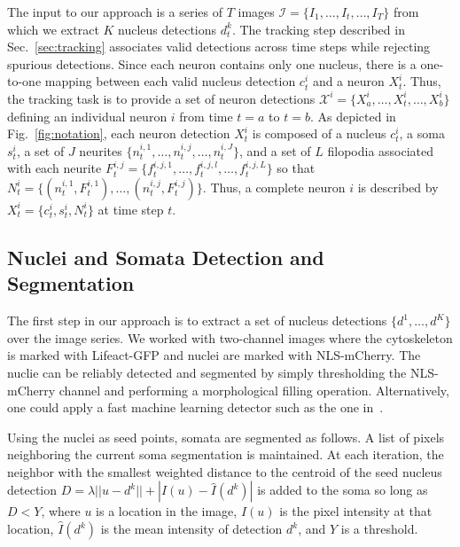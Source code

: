 
\vspace{-3mm}

The  input to  our approach  is a  series of  $T$ images  $\mathcal{I}  = \{I_1,
\ldots,  I_t,  \ldots, I_T\}$  from  which  we  extract $K$  nucleus  detections
$d_t^k$.   The  tracking step  described  in Sec.~\ref{sec:tracking}  associates
valid detections  across time steps  while rejecting spurious  detections. Since
each neuron  contains only  one nucleus, there  is a one-to-one  mapping between
each valid  nucleus detection $c_t^i$ and  a neuron $X_t^i$.  Thus, the tracking
task   is   to  provide   a   set   of   neuron  detections   $\mathcal{X}^i   =
\{X_{a}^i,\ldots,X_t^i,\ldots,X_{b}^i \}$ defining an individual neuron $i$ from
time  $t=a$  to $t=b$.   As  depicted  in  Fig.~\ref{fig:notation}, each  neuron
detection $X_t^i$ is composed of a nucleus $c_t^i$, a soma $s_t^i$, a set of $J$
neurites $\{n_t^{i,1},  \ldots, n_t^{i,j}, \ldots,  n_t^{i,J} \}$, and a  set of
$L$     filopodia    associated     with    each     neurite     $F_t^{i,j}    =
\{f_t^{i,j,1},\ldots,f_t^{i,j,l},\ldots,f_t^{i,j,L}  \}$ so  that  $N_t^i =  \{(
n_t^{i,1},F_t^{i,1}), \ldots,(n_t^{i,j},F_t^{i,j}) \}$.  Thus, a complete neuron
$i$ is described by $X_t^i = \{ c_t^i, s_t^i, N_t^i \}$ at time step $t$.



\subsection{Nuclei and Somata Detection and Segmentation}
\label{sec:detection}
\vspace{-2mm}
The  first  step in  our  approach  is to  extract  a  set of  nucleus
detections $\{d^1,\ldots,d^K\}$ over the  image series. We worked with
two-channel  images where the  cytoskeleton  is marked  with
Lifeact-GFP and  nuclei   are   marked   with
NLS-mCherry. The nuclie can be reliably detected and segmented
by simply thresholding  the NLS-mCherry channel and performing  a morphological
filling operation.  Alternatively, one could apply
a  fast machine learning detector such  as the  one
in~\cite{Smith09}.


Using  the nuclei  as  seed points,   somata are  segmented as follows. 
A list of  pixels neighboring the
current  soma  segmentation is  maintained.   At  each iteration,  the
neighbor with  the smallest weighted  distance to the centroid  of the
seed  nucleus  detection  $D  =  \lambda  ||  u  -  d^k||  +  |I(u)  -
\hat{I}(d^k)|$ is added to the soma so long as $D < Y$, where $u$ is a
location  in the  image,  $I(u)$  is  the pixel  intensity at  that
location, $\hat{I}(d^k)$ is the mean intensity of detection $d^k$, and
$Y$ is a threshold.


